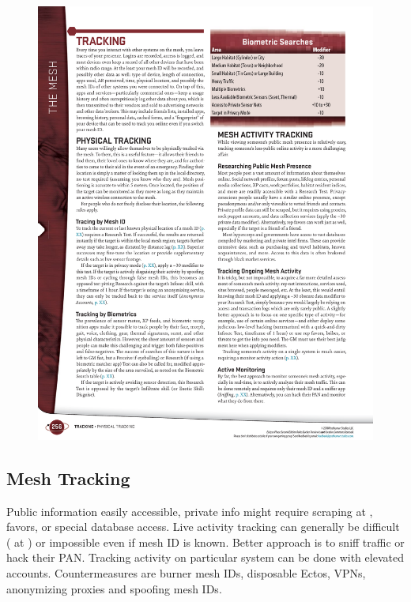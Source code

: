 \begin{figure}[htbp!]%
   \includegraphics[scale=1.0]{gfx/mesh-search-biometric}%
\end{figure}%

\subsection*{Mesh Tracking}

\begin{itemize}
   \itembox Public information easily accessible, private info might require  scraping at , favors, or special database access.
   \itembox Live activity tracking can generally be difficult ( at ) or impossible even if mesh ID is known. Better approach is to sniff traffic or hack their PAN. Tracking activity on particular system can be done with elevated accounts.
   \itembox Countermeasures are burner mesh IDs, disposable Ectos, VPNs, anonymizing proxies and spoofing mesh IDs.
\end{itemize}


